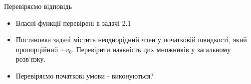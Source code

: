 \documentclass[a4paper, 14pt]{extreport}
\begin{document}
Перевіряємо відповідь

\begin{itemize}
    \item Власні функції перевірені в задачі 2.1
    \item Постановка задачі містить неоднорідний член у початковій швидкості, який пропорційний $\sim v_0$. Перевірити наявність цих множників у загальному розв'язку.
    \item Перевіряємо початкові умови - виконуються?

\end{itemize}







\end{document}
